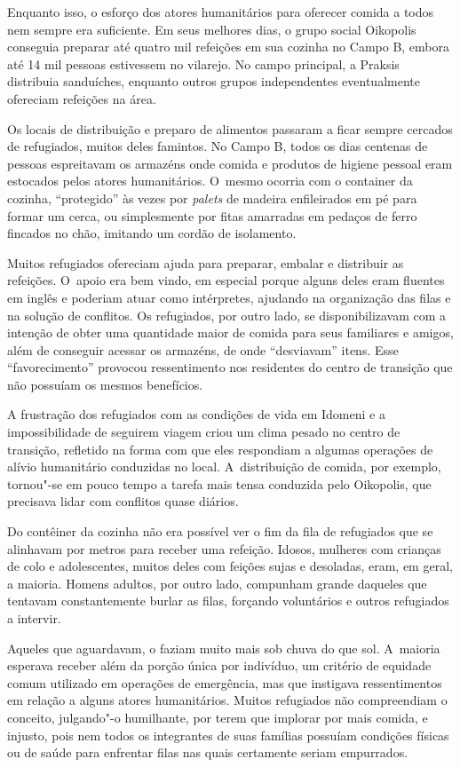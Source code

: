 Enquanto isso, o esforço dos atores humanitários para oferecer comida a todos
nem sempre era suficiente. Em seus melhores dias, o grupo social
Oikopolis conseguia preparar até quatro mil refeições em sua cozinha no
Campo B, embora até 14 mil pessoas estivessem no vilarejo. No campo
principal, a  Praksis distribuia sanduíches, enquanto outros grupos
independentes eventualmente ofereciam refeições na área.

Os locais de distribuição e preparo de alimentos passaram a ficar sempre
cercados de refugiados, muitos deles famintos. No Campo B, todos os dias
centenas de pessoas espreitavam os armazéns onde comida e produtos de
higiene pessoal eram estocados pelos atores humanitários. O~mesmo
ocorria com o container da cozinha, ``protegido'' às vezes por
\emph{palets} de madeira enfileirados em pé para formar um cerca, ou
simplesmente por fitas amarradas em pedaços de ferro fincados no chão,
imitando um cordão de isolamento.

Muitos refugiados ofereciam ajuda para preparar, embalar e distribuir as
refeições. O~apoio era bem vindo, em especial porque alguns deles eram
fluentes em inglês e poderiam atuar como intérpretes, ajudando na
organização das filas e na solução de conflitos. Os refugiados, por
outro lado, se disponibilizavam com a intenção de obter uma quantidade
maior de comida para seus familiares e amigos, além de conseguir acessar
os armazéns, de onde ``desviavam'' itens. Esse ``favorecimento''
provocou ressentimento nos residentes do centro de transição que não
possuíam os mesmos benefícios.

A frustração dos refugiados com as condições de vida em Idomeni e a
impossibilidade de seguirem viagem criou um clima pesado no centro de
transição, refletido na forma com que eles respondiam a algumas
operações de alívio humanitário conduzidas no local. A~distribuição de
comida, por exemplo, tornou"-se em pouco tempo a tarefa mais tensa
conduzida pelo Oikopolis, que precisava lidar com conflitos quase
diários.

Do contêiner da cozinha não era possível ver o fim da fila de refugiados
que se alinhavam por metros para receber uma refeição. Idosos, mulheres
com crianças de colo e adolescentes, muitos deles com feições sujas e
desoladas, eram, em geral, a maioria. Homens adultos, por outro lado,
compunham grande daqueles que tentavam constantemente burlar as filas,
forçando voluntários e outros refugiados a intervir.

Aqueles que aguardavam, o faziam muito mais sob chuva do que sol.
A~maioria esperava receber além da porção única por indivíduo, um
critério de equidade comum utilizado em operações de emergência, mas que
instigava ressentimentos em relação a alguns atores humanitários. Muitos
refugiados não compreendiam o conceito, julgando"-o humilhante, por terem
que implorar por mais comida, e injusto, pois nem todos os integrantes de
suas famílias possuíam condições físicas ou de saúde para enfrentar
filas nas quais certamente seriam empurrados.

